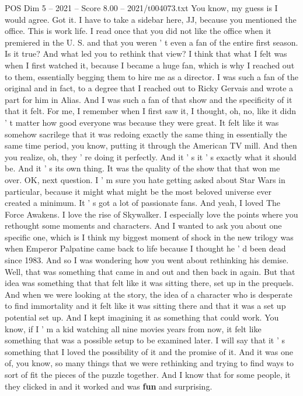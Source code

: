\begin{textsample}{POS Dim 5 – 2021 – Score 8.00 – 2021/t004073.txt}
You know, my guess is I would agree.
Got it.
I have to take a sidebar here, JJ, because you mentioned the office.
This is work life.
I read once that you did not like the office when it premiered in the U.
S. and that you weren ' t even a fan of the entire first season.
Is it true?
And what led you to rethink that view?
I think that what I felt was when I first watched it, because I became a huge fan, which is why I reached out to them, essentially begging them to hire me as a director.
I was such a fan of the original and in fact, to a degree that I reached out to Ricky Gervais and wrote a part for him in Alias.
And I was such a fan of that show and the specificity of it that it felt.
For me, I remember when I first saw it, I thought, oh, no, like it didn ' t matter how good everyone was because they were great.
It felt like it was somehow sacrilege that it was redoing exactly the same thing in essentially the same time period, you know, putting it through the American TV mill.
And then you realize, oh, they ' re doing it perfectly.
And it ' s it ' s exactly what it should be.
And it ' s its own thing.
It was the quality of the show that that won me over.
OK, next question.
I ' m sure you hate getting asked about Star Wars in particular, because it might what might be the most beloved universe ever created a minimum.
It ' s got a lot of passionate fans.
And yeah, I loved The Force Awakens.
I love the rise of Skywalker.
I especially love the points where you rethought some moments and characters.
And I wanted to ask you about one specific one, which is I think my biggest moment of shock in the new trilogy was when Emperor Palpatine came back to life because I thought he ' d been dead since 1983.
And so I was wondering how you went about rethinking his demise.
Well, that was something that came in and out and then back in again.
But that idea was something that that felt like it was sitting there, set up in the prequels.
And when we were looking at the story, the idea of a character who is desperate to find immortality and it felt like it was sitting there and that it was a set up potential set up.
And I kept imagining it as something that could work.
You know, if I ' m a kid watching all nine movies years from now, it felt like something that was a possible setup to be examined later.
I will say that it ' s something that I loved the possibility of it and the promise of it.
And it was one of, you know, so many things that we were rethinking and trying to find ways to sort of fit the pieces of the puzzle together.
And I know that for some people, it they clicked in and it worked and was \textbf{fun} and surprising.

\end{textsample}
